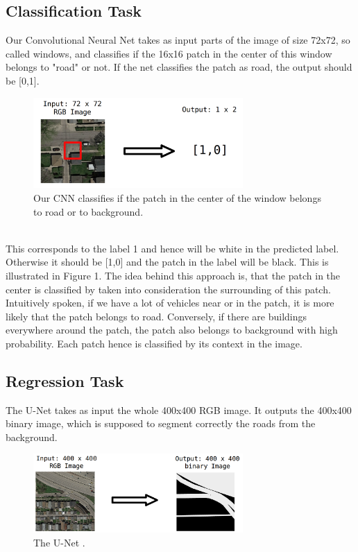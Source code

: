 \documentclass[10pt,conference,compsocconf]{IEEEtran}
\begin{document}
\subsection{Classification Task}

Our Convolutional Neural Net takes as input parts of the image of size 72x72, so called windows, and classifies if the 16x16 patch in the center of this window belongs to "road" or not. If the net classifies the patch as road, the output should be [0,1].
\begin{figure}[htbp]
	\centering
	\includegraphics[width=8cm]{images/classificationTask.png}
	\caption{Our CNN classifies if the patch in the center of the window belongs to road or to background.}
	\vspace{-3mm}
	\label{fig:clas}
\end{figure}
\\
This corresponds to the label 1 and hence will be white in the predicted label.  Otherwise it should be [1,0] and the patch in the label will be black. This is illustrated in Figure 1. 
The idea behind this approach is, that the patch in the center is classified by taken into consideration the surrounding of this patch. Intuitively spoken, if we have a lot of vehicles near or in the patch, it is more likely that the patch belongs to road. Conversely, if there are buildings everywhere around the patch, the patch also belongs to background with high probability. Each patch hence is classified by its context in the image. 
\subsection{Regression Task}
The U-Net takes as input the whole 400x400 RGB image. It outputs the 400x400 binary image, which is supposed to segment correctly the roads from the background.
\begin{figure}[htbp]
	\centering
	\includegraphics[width=8cm]{images/regressionTask.png}
	\caption{The U-Net .}
	\vspace{-3mm}
	\label{fig:regr}
\end{figure}
\end{document}

